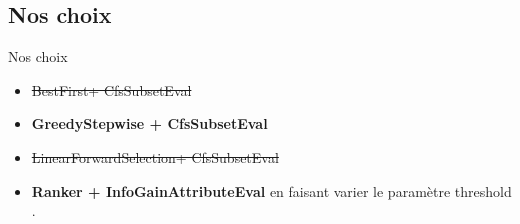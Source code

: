 \subsection{Nos choix}
\begin {frame} {Nos choix}
	\begin{itemize}
		\item \sout{BestFirst+ CfsSubsetEval}
		\item \textbf{GreedyStepwise + CfsSubsetEval}
		\item \sout{LinearForwardSelection+ CfsSubsetEval}
		\item \textbf{Ranker + InfoGainAttributeEval} en faisant varier le paramètre \og threshold \fg{}.
	\end{itemize}
\end{frame}